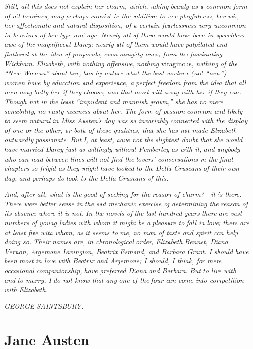 \textit{Still, all this does not explain her charm, which, taking beauty as a common form of all heroines, may perhaps consist in the addition to her playfulness, her wit, her affectionate and natural disposition, of a certain fearlessness very uncommon in heroines of her type and age. Nearly all of them would have been in speechless awe of the magnificent Darcy; nearly all of them would have palpitated and fluttered at the idea of proposals, even naughty ones, from the fascinating Wickham. Elizabeth, with nothing offensive, nothing} viraginous, \textit{nothing of the ``New Woman'' about her, has by nature what the best modern (not ``new'') women have by education and experience, a perfect freedom from the idea that all men may bully her if they choose, and that most will away with her if they can. Though not in the least ``impudent and mannish grown,'' she has no mere sensibility, no nasty niceness about her. The form of passion common and likely to seem natural in Miss Austen's day was so invariably connected with the display of one or the other, or both of these qualities, that she has not made Elizabeth outwardly passionate. But I, at least, have not the slightest doubt that she would have married Darcy just as willingly without Pemberley as with it, and anybody who can read between lines will not find the lovers' conversations in the final chapters so frigid as they might have looked to the Della Cruscans of their own day, and perhaps do look to the Della Cruscans of this.}

\textit{And, after all, what is the good of seeking for the reason of charm?---it is there. There were better sense in the sad mechanic exercise of determining the reason of its absence where it is not. In the novels of the last hundred years there are vast numbers of young ladies with whom it might be a pleasure to fall in love; there are at least five with whom, as it seems to me, no man of taste and spirit can help doing so. Their names are, in chronological order, Elizabeth Bennet, Diana Vernon, Argemone Lavington, Beatrix Esmond, and Barbara Grant. I should have been most in love with Beatrix and Argemone; I should, I think, for mere occasional companionship, have preferred Diana and Barbara. But to live with and to marry, I do not know that any one of the four can come into competition with Elizabeth.}

\textit{GEORGE SAINTSBURY.}

\chapter{Jane Austen}
